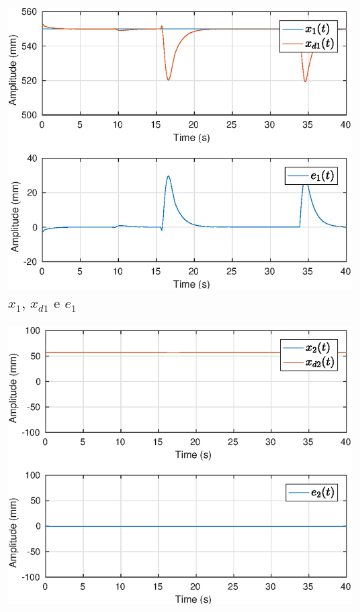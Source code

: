 \begin{figure}[H]
\centering
\begin{subfigure}{.5\textwidth}
  \centering
  \includegraphics[width=\linewidth]{./img/position/x1.eps}
  \caption{$x_1$, $x_{d1}$ e $e_1$}
  \label{fig:sub1}
\end{subfigure}%
\begin{subfigure}{.5\textwidth}
  \centering
  \includegraphics[width=\linewidth]{./img/position/x2.eps}

\end{subfigure}
\end{figure}
